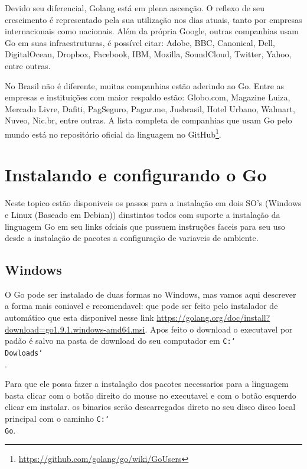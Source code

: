 \documentclass{SBCbookchapter}
\begin{document}
Devido seu diferencial, Golang está em plena ascenção. O reflexo de seu crescimento é representado pela sua utilização nos dias atuais, tanto por empresas internacionais como nacionais. Além da própria Google, outras companhias usam Go em suas infraestruturas, é possível citar: Adobe, BBC, Canonical, Dell, DigitalOcean, Dropbox, Facebook, IBM, Mozilla, SoundCloud, Twitter, Yahoo, entre outras.

No Brasil não é diferente, muitas companhias estão aderindo ao Go. Entre as empresas e instituições com maior respaldo estão: Globo.com, Magazine Luiza, Mercado Livre, Dafiti, PagSeguro, Pagar.me, Jusbrasil, Hotel Urbano, Walmart, Nuveo, Nic.br, entre outras. A lista completa de companhias que usam Go pelo mundo está no repositório oficial da linguagem no GitHub\footnote{\url{https://github.com/golang/go/wiki/GoUsers}}.

\section{Instalando e configurando o Go}

Neste topico estão disponiveis os passos para a instalação em dois SO's (Windows e Linux (Baseado em Debian)) dinstintos todos com suporte a instalação da linguagem Go em seu links ofciais que pussuem instruções faceis para seu uso desde a instalação de pacotes a configuração de variaveis de ambiente.

\subsection{Windows}

O Go pode ser instalado de duas formas no Windows, mas vamos aqui descrever a forma mais coniavel e recomendavel: que pode ser feito pelo instalador de automático que esta disponivel nesse link \url{https://golang.org/doc/install?download=go1.9.1.windows-amd64.msi}.  Apos feito o download o executavel por padão é salvo na pasta de download do seu computador em \texttt{C:\char`\\Dowloads\char`\\}.

Para que ele possa fazer a instalação dos pacotes necessarios para a linguagem basta clicar com o botão direito do mouse no executavel e com o botão esquerdo clicar em instalar. os binarios serão descarregados direto no seu disco disco local principal com o caminho \texttt{C:\char`\\Go}.
\end{document}
